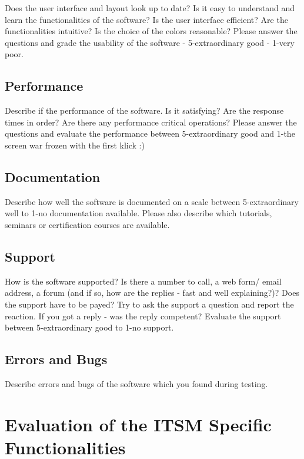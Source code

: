 Does the user interface and layout look up to date? Is it easy to understand and learn the functionalities of the software? Is the user interface efficient? Are the functionalities intuitive? Is the choice of the colors reasonable? Please answer the questions and grade the usability of the software - 5-extraordinary good - 1-very poor.

\section{Performance}

Describe if the performance of the software. Is it satisfying? Are the response times in order? Are there any performance critical operations? Please answer the questions and evaluate the performance between 5-extraordinary good and 1-the screen war frozen with the first klick :)

\section{Documentation}

Describe how well the software is documented on a scale between 5-extraordinary well to 1-no documentation available. Please also describe which tutorials, seminars or certification courses are available. 
\section{Support}

How is the software supported? Is there a number to call, a web form/ email address, a forum (and if so, how are the replies - fast and well explaining?)? Does the support have to be payed? Try to ask the support a question and report the reaction. If you got a reply - was the reply competent? Evaluate the support between 5-extraordinary good to 1-no support.



\section{Errors and Bugs}

Describe errors and bugs of the software which you found during testing.

\chapter{Evaluation of the ITSM Specific Functionalities}

